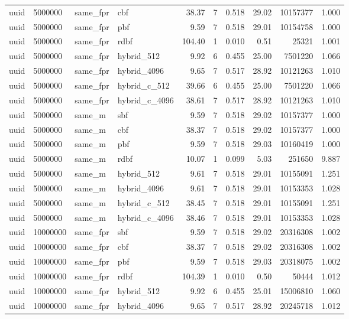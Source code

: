 \begin{tabular}{llllrrrrrr}
uuid & 5000000 & same\_fpr & cbf & 38.37 & 7 & 0.518 & 29.02 & 10157377 & 1.000 \\
uuid & 5000000 & same\_fpr & pbf & 9.59 & 7 & 0.518 & 29.01 & 10154758 & 1.000 \\
uuid & 5000000 & same\_fpr & rdbf & 104.40 & 1 & 0.010 & 0.51 & 25321 & 1.001 \\
uuid & 5000000 & same\_fpr & hybrid\_512 & 9.92 & 6 & 0.455 & 25.00 & 7501220 & 1.066 \\
uuid & 5000000 & same\_fpr & hybrid\_4096 & 9.65 & 7 & 0.517 & 28.92 & 10121263 & 1.010 \\
uuid & 5000000 & same\_fpr & hybrid\_c\_512 & 39.66 & 6 & 0.455 & 25.00 & 7501220 & 1.066 \\
uuid & 5000000 & same\_fpr & hybrid\_c\_4096 & 38.61 & 7 & 0.517 & 28.92 & 10121263 & 1.010 \\
uuid & 5000000 & same\_m & sbf & 9.59 & 7 & 0.518 & 29.02 & 10157377 & 1.000 \\
uuid & 5000000 & same\_m & cbf & 38.37 & 7 & 0.518 & 29.02 & 10157377 & 1.000 \\
uuid & 5000000 & same\_m & pbf & 9.59 & 7 & 0.518 & 29.03 & 10160419 & 1.000 \\
uuid & 5000000 & same\_m & rdbf & 10.07 & 1 & 0.099 & 5.03 & 251650 & 9.887 \\
uuid & 5000000 & same\_m & hybrid\_512 & 9.61 & 7 & 0.518 & 29.01 & 10155091 & 1.251 \\
uuid & 5000000 & same\_m & hybrid\_4096 & 9.61 & 7 & 0.518 & 29.01 & 10153353 & 1.028 \\
uuid & 5000000 & same\_m & hybrid\_c\_512 & 38.45 & 7 & 0.518 & 29.01 & 10155091 & 1.251 \\
uuid & 5000000 & same\_m & hybrid\_c\_4096 & 38.46 & 7 & 0.518 & 29.01 & 10153353 & 1.028 \\
uuid & 10000000 & same\_fpr & sbf & 9.59 & 7 & 0.518 & 29.02 & 20316308 & 1.002 \\
uuid & 10000000 & same\_fpr & cbf & 38.37 & 7 & 0.518 & 29.02 & 20316308 & 1.002 \\
uuid & 10000000 & same\_fpr & pbf & 9.59 & 7 & 0.518 & 29.03 & 20318075 & 1.002 \\
uuid & 10000000 & same\_fpr & rdbf & 104.39 & 1 & 0.010 & 0.50 & 50444 & 1.012 \\
uuid & 10000000 & same\_fpr & hybrid\_512 & 9.92 & 6 & 0.455 & 25.01 & 15006810 & 1.060 \\
uuid & 10000000 & same\_fpr & hybrid\_4096 & 9.65 & 7 & 0.517 & 28.92 & 20245718 & 1.012 \\

\end{tabular}
